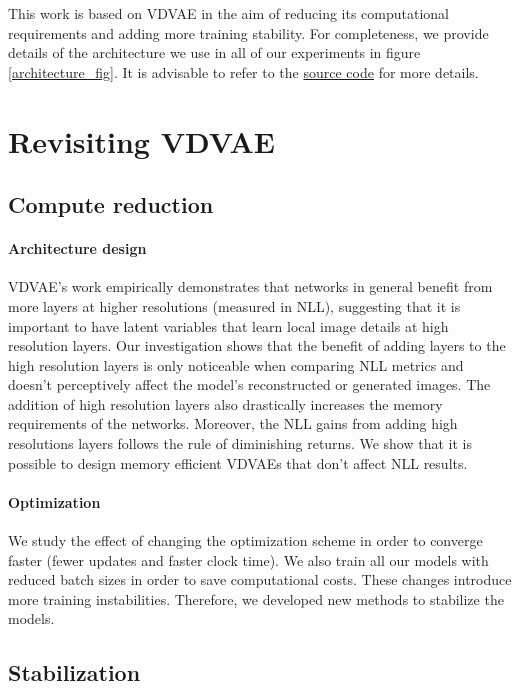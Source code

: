 \documentclass{article}
\begin{document}
This work is based on VDVAE in the aim of reducing its computational requirements and adding more training stability. For completeness, we provide details of the architecture we use in all of our experiments in figure \ref{architecture_fig}. It is advisable to refer to the \href{https://github.com/Rayhane-mamah/Efficient-VDVAE}{source code} for more details.

\section{Revisiting VDVAE}
\label{contributions}

\subsection{Compute reduction} \label{compute_reduction}
\paragraph{Architecture design} VDVAE's work\cite{child2021very} empirically demonstrates that networks in general benefit from more layers at higher resolutions (measured in NLL), suggesting that it is important to have latent variables that learn local image details at high resolution layers. Our investigation shows that the benefit of adding layers to the high resolution layers is only noticeable when comparing NLL metrics and doesn't perceptively affect the model's reconstructed or generated images. The addition of high resolution layers also drastically increases the memory requirements of the networks. Moreover, the NLL gains from adding high resolutions layers follows the rule of diminishing returns. We show that it is possible to design memory efficient VDVAEs that don't affect NLL results.

\paragraph{Optimization} We study the effect of changing the optimization scheme in order to converge faster (fewer updates and faster clock time). We also train all our models with reduced batch sizes in order to save computational costs. These changes introduce more training instabilities. Therefore, we developed new methods to stabilize the models. 

\subsection{Stabilization} 
\end{document}
